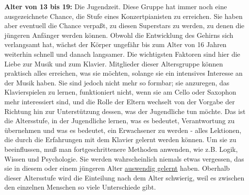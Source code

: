 \textbf{Alter von 13 bis 19:} Die Jugendzeit.
Diese Gruppe hat immer noch eine ausgezeichnete Chance, die Stufe eines Konzertpianisten zu erreichen.
Sie haben aber eventuell die Chance verpaßt, zu diesen Superstars zu werden, zu denen die jüngeren Anfänger werden können.
Obwohl die Entwicklung des Gehirns sich verlangsamt hat, wächst der Körper ungefähr bis zum Alter von 16 Jahren weiterhin schnell und danach langsamer.
Die wichtigsten Faktoren sind hier die Liebe zur Musik und zum Klavier.
Mitglieder dieser Altersgruppe können praktisch alles erreichen, was sie möchten, solange sie ein intensives Interesse an der Musik haben.
Sie sind jedoch nicht mehr so formbar; sie anzuregen, das Klavierspielen zu lernen, funktioniert  nicht, wenn sie am Cello oder Saxophon mehr interessiert sind, und die Rolle der Eltern wechselt von der Vorgabe der Richtung hin zur Unterstützung dessen, was der Jugendliche tun möchte.
Das ist die Altersstufe, in der Jugendliche lernen, was es bedeutet, Verantwortung zu übernehmen und was es bedeutet, ein Erwachsener zu werden - alles Lektionen, die durch die Erfahrungen mit dem Klavier gelernt werden können.
Um sie zu beeinflussen, muß man fortgeschrittenere Methoden anwenden, wie z.B. Logik, Wissen und Psychologie.
Sie werden wahrscheinlich niemals etwas vergessen, das sie in diesem oder einem jüngeren Alter \hyperlink{c1iii6}{auswendig gelernt} haben.
Oberhalb dieser Altersstufe wird die Einteilung nach dem Alter schwierig, weil es zwischen den einzelnen Menschen so viele Unterschiede gibt.


\hypertarget{c1iii18c20}{}

